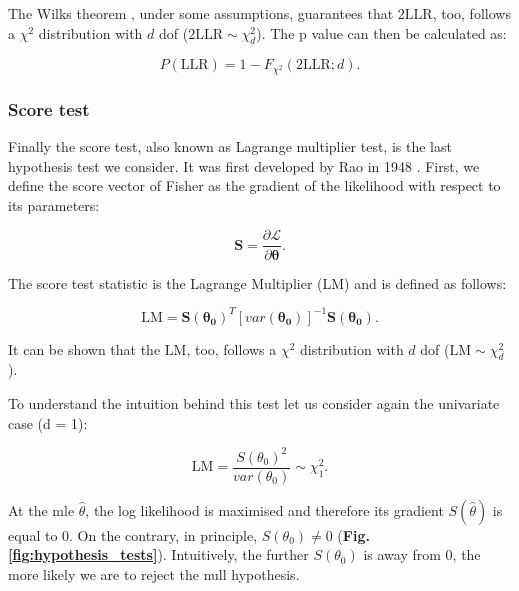 The Wilks theorem \cite{wilks1938large}, under some assumptions, guarantees that $2\mathrm{LLR}$, too, follows a $\chi^2$ distribution with $d$ dof ($2\mathrm{LLR} \sim \chi^2_d$).
The p value can then be calculated as:

\begin{equation}\label{eq:lrt_p_value}
    P(\mathrm{LLR}) = 1-F_{\chi^2}(2\mathrm{LLR}; d).
\end{equation}

\subsubsection{Score test}

Finally the score test, also known as Lagrange multiplier test, is the last hypothesis test we consider. 
It was first developed by Rao in 1948 \cite{rao1948large}.
First, we define the score vector of Fisher as the gradient of the likelihood with respect to its parameters:

\begin{equation}\label{eq:score_vector}
    \mathbf{S} = \frac{\partial \mathcal{L}}{\partial \boldsymbol{\theta}}.
\end{equation}

The score test statistic is the Lagrange Multiplier (LM) and is defined as follows:

\begin{equation}\label{eq:lagrange_multiplier}
    \mathrm{LM} = \mathbf{S}(\boldsymbol{\theta_0})^T [var(\boldsymbol{\theta_0})]^{-1}\mathbf{S}(\boldsymbol{\theta_0}). 
\end{equation}

It can be shown that the $\mathrm{LM}$, too, follows a $\chi^2$ distribution with $d$ dof ($\mathrm{LM} \sim \chi^2_d$).

To understand the intuition behind this test let us consider again the univariate case (d = 1):

\begin{equation}\label{eq:lagrange_multiplier_univariate}
    \mathrm{LM} = \frac{S(\theta_0)^2}{var(\theta_0)} \sim \chi^2_1.
\end{equation}

At the \gls{mle} $\hat{\theta}$, the log likelihood is maximised and therefore its gradient $S(\hat{\theta})$ is equal to $0$.
On the contrary, in principle, $ S(\theta_0) \neq 0 $ (\textbf{Fig. \ref{fig:hypothesis_tests}}). 
Intuitively, the further $ S(\theta_0) $ is away from 0, the more likely we are to reject the null hypothesis.


